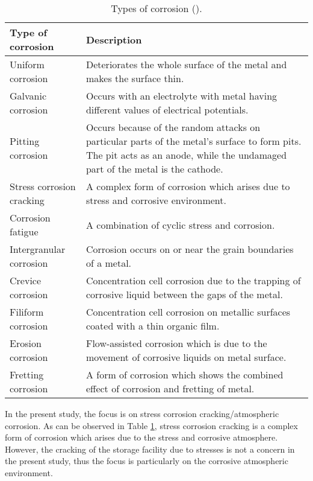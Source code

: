 \begin{table}[H]
\caption{Types of corrosion (\cite{chigondo2016recent}).}

\centering
\renewcommand{\arraystretch}{2}
\begin{tabularx}{\textwidth}{>{\hsize=0.65\hsize}X >{\hsize=1.35\hsize}X}
    \hline
    Type of corrosion & Description \\
    \hline
    Uniform corrosion & Deteriorates the whole surface of the metal and makes the surface thin. \\
    Galvanic corrosion & Occurs with an electrolyte with metal having different values of electrical potentials. \\
    Pitting corrosion & Occurs because of the random attacks on particular parts of the metal's surface to form pits. The pit acts as an anode, while the undamaged part of the metal is the cathode. \\
    Stress corrosion cracking & A complex form of corrosion which arises due to stress and  corrosive environment. \\
    Corrosion fatigue & A combination of cyclic stress and corrosion.  \\
    Intergranular corrosion & Corrosion occurs on or near the grain boundaries of a metal.  \\
    Crevice corrosion & Concentration cell corrosion due to the trapping of corrosive liquid  between the gaps of the metal. \\
    Filiform corrosion & Concentration cell corrosion on metallic surfaces coated with a thin  organic film. \\
    Erosion corrosion & Flow-assisted corrosion which is due to the movement of corrosive  liquids on metal surface. \\
    Fretting corrosion & A form of corrosion which shows the combined effect of corrosion and  fretting of metal. \\
    \hline
\end{tabularx}

\label{ch3:table:corrosions}
\end{table}

In the present study, the focus is on stress corrosion cracking/atmospheric corrosion. As can be observed in Table \ref{ch3:table:corrosions}, stress corrosion cracking is a complex form of corrosion which arises due to the stress and corrosive atmosphere. However, the cracking of the storage facility due to stresses is not a concern in the present study, thus the focus is particularly on the corrosive atmospheric environment.

